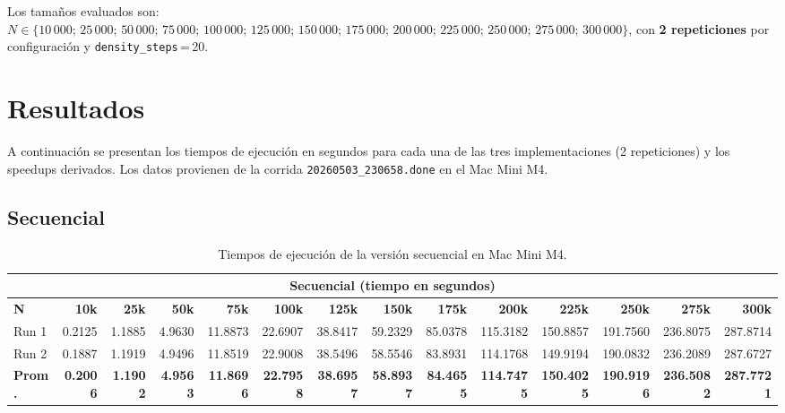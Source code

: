 \documentclass{article}
\begin{document}
Los tama\~nos evaluados son: $N \in \{10\,000;\, 25\,000;\, 50\,000;\, 75\,000;\,
100\,000;\, 125\,000;\, 150\,000;\, 175\,000;\, 200\,000;\, 225\,000;\, 250\,000;\,
275\,000;\, 300\,000\}$, con \textbf{2 repeticiones} por configuraci\'on y
\texttt{density\_steps}\,=\,20.

\section{Resultados}

A continuaci\'on se presentan los tiempos de ejecuci\'on en segundos para cada una de las
tres implementaciones (2 repeticiones) y los speedups derivados. Los datos provienen de
la corrida \texttt{20260503\_230658.done} en el Mac Mini M4.

\subsection{Secuencial}

\begin{table}[H]
\centering
\scriptsize
\begin{adjustbox}{max width=\textwidth}
\begin{tabular}{|l|r|r|r|r|r|r|r|r|r|r|r|r|r|}
\hline
\multicolumn{14}{|c|}{\textbf{Secuencial (tiempo en segundos)}} \\
\hline
\textbf{N} & \textbf{10k} & \textbf{25k} & \textbf{50k} & \textbf{75k} & \textbf{100k}
           & \textbf{125k} & \textbf{150k} & \textbf{175k} & \textbf{200k}
           & \textbf{225k} & \textbf{250k} & \textbf{275k} & \textbf{300k} \\
\hline
Run 1
  & 0.2125 & 1.1885 & 4.9630 & 11.8873 & 22.6907
  & 38.8417 & 59.2329 & 85.0378 & 115.3182
  & 150.8857 & 191.7560 & 236.8075 & 287.8714 \\
Run 2
  & 0.1887 & 1.1919 & 4.9496 & 11.8519 & 22.9008
  & 38.5496 & 58.5546 & 83.8931 & 114.1768
  & 149.9194 & 190.0832 & 236.2089 & 287.6727 \\
\hline
\textbf{Prom.}
  & \textbf{0.2006} & \textbf{1.1902} & \textbf{4.9563} & \textbf{11.8696}
  & \textbf{22.7958} & \textbf{38.6957} & \textbf{58.8937} & \textbf{84.4655}
  & \textbf{114.7475} & \textbf{150.4025} & \textbf{190.9196}
  & \textbf{236.5082} & \textbf{287.7721} \\
\hline
\end{tabular}
\end{adjustbox}
\caption{Tiempos de ejecuci\'on de la versi\'on secuencial en Mac Mini M4.}
\label{tab:seq}
\end{table}
\end{document}
